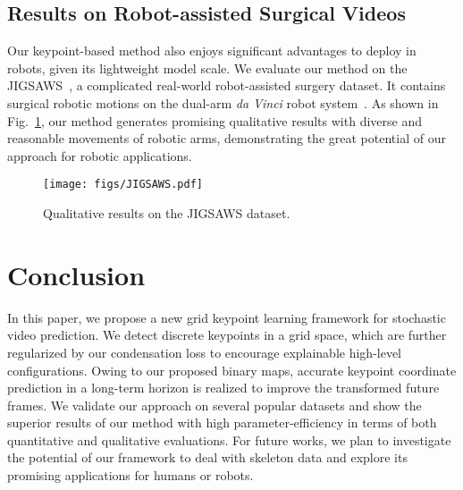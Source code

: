 \documentclass[letterpaper, 10 pt, conference]{ieeeconf}
\begin{document}
\subsection{Results on Robot-assisted Surgical Videos}
Our keypoint-based method also enjoys significant advantages to deploy in robots, given its lightweight model scale.
We evaluate our method on the JIGSAWS~\cite{gao2014jhu}, a complicated real-world robot-assisted surgery dataset.
It contains surgical robotic motions on the dual-arm \textit{da Vinci} robot system~\cite{Freschi2013}.
As shown in Fig.~\ref{fig:jigsaws}, our method generates promising qualitative results with diverse and reasonable movements of robotic arms, demonstrating the great potential of our approach for robotic applications.



\begin{figure}[t]
	\texttt{[image: figs/JIGSAWS.pdf]}
	\centering
	\caption{Qualitative results on the JIGSAWS dataset.  
	}
	\label{fig:jigsaws}
	\vspace{-4mm}
\end{figure}




\section{Conclusion}

In this paper, we propose a new grid keypoint learning framework for stochastic video prediction. 
We detect discrete keypoints in a grid space, which are further regularized by our condensation loss to encourage explainable high-level configurations. 
Owing to our proposed binary maps, accurate keypoint coordinate prediction in a long-term horizon is realized to improve the transformed future frames. 
We validate our approach on several popular datasets and show the superior results of our method with high parameter-efficiency in terms of both quantitative and qualitative evaluations.
For future works, we plan to investigate the potential of our framework to deal with skeleton data and explore its promising applications for humans or robots.














\end{document}
